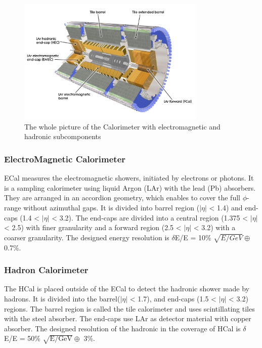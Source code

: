 \begin{figure}[tbp]
\begin{center}
 \includegraphics[width=0.8\textwidth,keepaspectratio]{figures/detector/Calo}
\caption{
The whole picture of the Calorimeter with electromagnetic and hadronic subcomponents
}
\label{fig:calo}
\end{center}
\end{figure}


\subsubsection{ElectroMagnetic Calorimeter}
ECal measures the electromagnetic showers, initiated by electrons or photons. It is a sampling calorimeter using liquid Argon (LAr) with the lead (Pb) absorbers. They are arranged in an accordion geometry, which enables to cover the full $\phi$-range without azimuthal gaps. It is divided into barrel region ($|\eta|$ < 1.4) and end-caps (1.4 < $|\eta|$ < 3.2). The end-caps are divided into a central region (1.375 < $|\eta|$ < 2.5) with finer granularity and a forward region (2.5 < $|\eta|$ < 3.2) with a coarser granularity. The designed energy resolution is $\delta$E/E = 10\% $\sqrt{E/GeV} \oplus$ 0.7\%.

\subsubsection{Hadron Calorimeter}
The HCal is placed outside of the ECal to detect the hadronic shower made by hadrons.
It is divided into the barrel($|\eta|$ < 1.7), and end-caps (1.5 < $|\eta|$ < 3.2) regions. 
The barrel region is called the tile calorimeter and uses scintillating tiles with the steel absorber. 
The end-caps use LAr as detector material with copper absorber. 
The designed resolution of the hadronic in the coverage of HCal is $\delta$E/E = 50\% $\sqrt{\mathrm{E/GeV}} \oplus$ 3\%.

